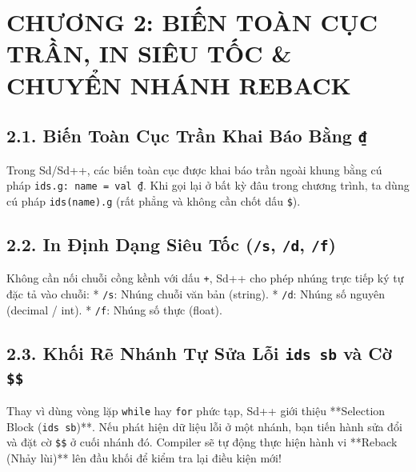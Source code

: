 \documentclass[11pt, a4paper]{article}
\begin{document}
\section{CHƯƠNG 2: BIẾN TOÀN CỤC TRẦN, IN SIÊU TỐC \& CHUYỂN NHÁNH REBACK}

\subsection{2.1. Biến Toàn Cục Trần Khai Báo Bằng \texttt{₫}}
Trong Sd/Sd++, các biến toàn cục được khai báo trần ngoài khung bằng cú pháp \texttt{ids.g: name = val ₫}. Khi gọi lại ở bất kỳ đâu trong chương trình, ta dùng cú pháp \texttt{ids(name).g} (rất phẳng và không cần chốt dấu \texttt{\$}).

\subsection{2.2. In Định Dạng Siêu Tốc (\texttt{/s}, \texttt{/d}, \texttt{/f})}
Không cần nối chuỗi cồng kềnh với dấu \texttt{+}, Sd++ cho phép nhúng trực tiếp ký tự đặc tả vào chuỗi:
* \texttt{/s}: Nhúng chuỗi văn bản (string).
* \texttt{/d}: Nhúng số nguyên (decimal / int).
* \texttt{/f}: Nhúng số thực (float).

\subsection{2.3. Khối Rẽ Nhánh Tự Sửa Lỗi \texttt{ids sb} và Cờ \texttt{\$\$}}
Thay vì dùng vòng lặp \texttt{while} hay \texttt{for} phức tạp, Sd++ giới thiệu **Selection Block (\texttt{ids sb})**. Nếu phát hiện dữ liệu lỗi ở một nhánh, bạn tiến hành sửa đổi và đặt cờ \texttt{\$\$} ở cuối nhánh đó. Compiler sẽ tự động thực hiện hành vi **Reback (Nhảy lùi)** lên đầu khối để kiểm tra lại điều kiện mới!
\end{document}

